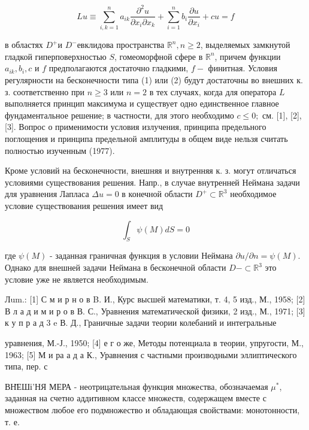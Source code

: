 \documentclass[10pt]{article}
\begin{document}
\[

L u \equiv \sum_{i, k=1}^{n} a_{i k} \frac{\partial^{2} u}{\partial x_{i} \partial x_{k}}+\sum_{i=1}^{n} b_{i} \frac{\partial u}{\partial x_{i}}+c u=f

\]



в областях $D^{+}$и $D^{-}$евклидова пространства $\mathbb{R}^{n}, n \geqslant 2$, выделяемых замкнутой гладкой гиперповерхностью $S$, гомеоморфной сфере в $\mathbb{R}^{n}$, причем функции $a_{i k}, b_{i}, c$ и $f$ предполагаются достаточно гладкими, $f-$ финитная. Условия регулярности на бесконечности типа (1) или (2) будут достаточны во внешних к. з. соответственно при $n \geqslant 3$ или $n=2$ в тех случаях, когда для оператора $L$ выполняется принцип максимума и существует одно единственное главное фундаментальное решение; в частности, для этого необходимо $c \leqslant 0 ;$ см. [1], [2], [3]. Вопрос о применимости условия излучения, принципа предельного поглощения и принципа предельной амплитуды в общем виде нельзя считать полностью изученным (1977).



Кроме условий на бесконечности, внешняя и внутренняя к. з. могут отличаться условиями существования решения. Напр., в случае внутренней Неймана задачи для уравнения Лапласа $\Delta u=0$ в конечной области $D^{+} \subset \mathbb{R}^{3}$ необходимое условие существования решения имеет вид



\[

\int_{S} \psi(M) d S=0

\]



где $\psi(M)$ - заданная граничная функция в условии Неймана $\partial u / \partial n=\psi(M)$. Однако для внешней задачи Неймана в бесконечной области $D-\subset \mathbb{R}^{3}$ это условие уже не является необходимым.



Лum.: [1] С м и р н о в B. И., Курс высшей математики, т. 4, 5 изд., М., 1958; [2] В л а д и м и р о в В. С., Уравнения математической физики, 2 изд., М., 1971; [3] к у п р а д 3 e В. Д., Граничные задачи теории колебаний и интегральные

уравнения, М.-Ј., 1950; [4] е г о же, Методы потенциала в теории, упругости, М., 1963; [5] М и ра а д а К., Уравнения с частными производными эллиптического типа, пер. с



ВН̈ЕШі'НЯ МЕРА - неотрицательная функция множества, обозначаемая $\mu^{*}$, заданная на счетно аддитивном классе множеств, содержащем вместе с множеством любое его подмножество и обладающая свойствами: монотонности, т. е.
\end{document}

